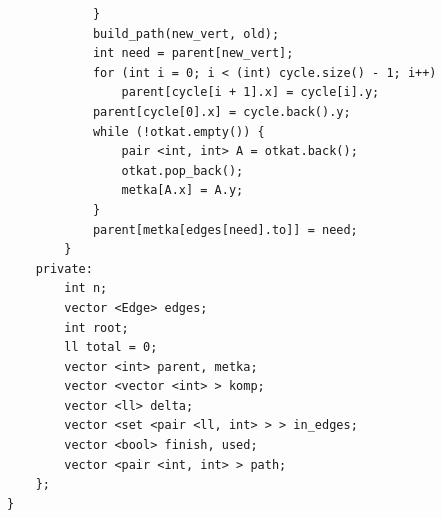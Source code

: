 \documentclass[10pt, portrait,letterpaper]{article}
\begin{document}
\begin{verbatim}
            }
            build_path(new_vert, old);
            int need = parent[new_vert];
            for (int i = 0; i < (int) cycle.size() - 1; i++)
                parent[cycle[i + 1].x] = cycle[i].y;
            parent[cycle[0].x] = cycle.back().y;
            while (!otkat.empty()) {
                pair <int, int> A = otkat.back();
                otkat.pop_back();
                metka[A.x] = A.y;
            }
            parent[metka[edges[need].to]] = need;
        }
    private:
        int n;
        vector <Edge> edges;
        int root;
        ll total = 0;
        vector <int> parent, metka;
        vector <vector <int> > komp;
        vector <ll> delta;
        vector <set <pair <ll, int> > > in_edges;
        vector <bool> finish, used;
        vector <pair <int, int> > path;
    };
}
\end{verbatim}
\end{document}
